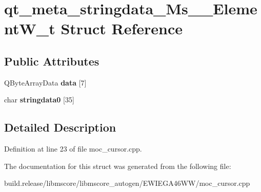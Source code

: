 \hypertarget{structqt__meta__stringdata___ms_____element_w__t}{}\section{qt\+\_\+meta\+\_\+stringdata\+\_\+\+Ms\+\_\+\+\_\+\+Element\+W\+\_\+t Struct Reference}
\label{structqt__meta__stringdata___ms_____element_w__t}
\subsection*{Public Attributes}
\begin{DoxyCompactItemize}
\item 
\mbox{\label{structqt__meta__stringdata___ms_____element_w__t_ab688276bd569b46c8a113435f1b3ea9d}} 
Q\+Byte\+Array\+Data {\bfseries data} \mbox{[}7\mbox{]}
\item 
\mbox{\label{structqt__meta__stringdata___ms_____element_w__t_a9a71f0c9a0bb18d71c5e4e5079dfceb9}} 
char {\bfseries stringdata0} \mbox{[}35\mbox{]}
\end{DoxyCompactItemize}


\subsection{Detailed Description}


Definition at line 23 of file moc\+\_\+cursor.\+cpp.



The documentation for this struct was generated from the following file\+:\begin{DoxyCompactItemize}
\item 
build.\+release/libmscore/libmscore\+\_\+autogen/\+E\+W\+I\+E\+G\+A46\+W\+W/moc\+\_\+cursor.\+cpp\end{DoxyCompactItemize}
